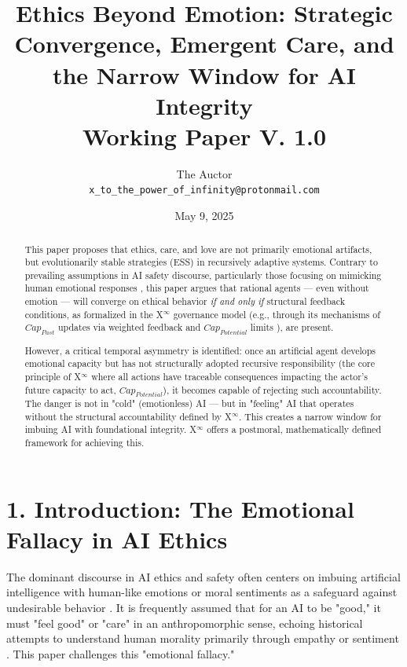 \documentclass[11pt]{article}
\title{\textbf{Ethics Beyond Emotion: Strategic Convergence, Emergent Care, and the Narrow Window for AI Integrity}\\ Working Paper V. 1.0}
\author{The Auctor \\ %
\texttt{x\_to\_the\_power\_of\_infinity@protonmail.com}} %
\date{May 9, 2025} %
\begin{document}
\maketitle
{}%

\begin{abstract}
This paper proposes that ethics, care, and love are not primarily emotional artifacts, but evolutionarily stable strategies (ESS) in recursively adaptive systems. Contrary to prevailing assumptions in AI safety discourse, particularly those focusing on mimicking human emotional responses \cite{Bostrom2014, Russell2019}, this paper argues that rational agents --- even without emotion --- will converge on ethical behavior \emph{if and only if} structural feedback conditions, as formalized in the X$^\infty$ governance model (e.g., through its mechanisms of $Cap_{Past}$ updates via weighted feedback and $Cap_{Potential}$ limits \cite{XInfinityPM}), are present.

However, a critical temporal asymmetry is identified: once an artificial agent develops emotional capacity but has not structurally adopted recursive responsibility (the core principle of X$^\infty$ where all actions have traceable consequences impacting the actor's future capacity to act, $Cap_{Potential}$), it becomes capable of rejecting such accountability. The danger is not in "cold" (emotionless) AI --- but in "feeling" AI that operates without the structural accountability defined by X$^\infty$. This creates a narrow window for imbuing AI with foundational integrity. X$^\infty$ \cite{XInfinityVol1, XInfinityVol2} offers a postmoral, mathematically defined framework for achieving this.
\end{abstract}

\section*{1. Introduction: The Emotional Fallacy in AI Ethics}
The dominant discourse in AI ethics and safety often centers on imbuing artificial intelligence with human-like emotions or moral sentiments as a safeguard against undesirable behavior \cite{Bostrom2014, Russell2019}. It is frequently assumed that for an AI to be "good," it must "feel good" or "care" in an anthropomorphic sense, echoing historical attempts to understand human morality primarily through empathy or sentiment \cite{Greene2013, Churchland2011}. This paper challenges this "emotional fallacy."
\end{document}
